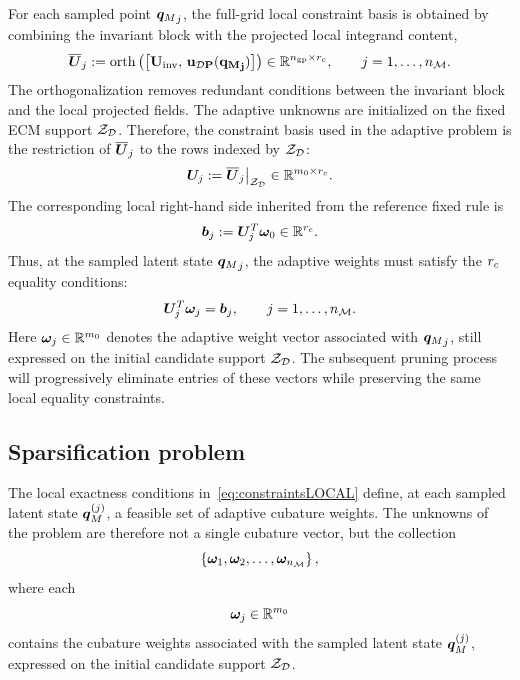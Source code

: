 \documentclass[11pt,a4paper]{article}
\newcommand{\PROMPT}[1]{ }
\begin{document}
For each sampled point \({\bm{q}_M}_j\), the full-grid local constraint basis is
obtained by combining the invariant block with the projected local integrand
content,
\begin{equation}
\label{eq:invariants}
    \overline{\bm{U}}_{j}
    :=
    \operatorname{orth}
    \left(
    \left[
    \bf{U}_{\mathrm{inv}},\,
    \bm{u}_{\mathcal{D}P}({\bm{q}_M}_j)
    \right]
    \right)
    \in
    \mathbb{R}^{n_{\mathrm{gp}}\times r_c},
    \qquad
    j=1,\ldots,n_{\mathcal{M}} .
\end{equation}
The orthogonalization removes redundant conditions between the invariant block
and the local projected fields.
The adaptive unknowns are initialized on the fixed ECM support \(\mathcal{Z}_{\mathcal{D}}\).
Therefore, the constraint basis used in the adaptive problem is the restriction
of \(\overline{\bm{U}}_{j}\) to the rows indexed by \(\mathcal{Z}_{\mathcal{D}}\):
\[
    \bm{U}_{j}
    :=
    \overline{\bm{U}}_{j}\big|_{\mathcal{Z}_{\mathcal{D}}}
    \in
    \mathbb{R}^{m_0\times r_c}.
\]
The corresponding local right-hand side inherited from the reference fixed rule
is
\[
    \bm{b}_{j}
    :=
    \bm{U}_{j}^{T}\bm{\omega}_0
    \in
    \mathbb{R}^{r_c}.
\]
Thus, at the sampled latent state \({\bm{q}_M}_j\), the adaptive weights must
satisfy the $r_c$   equality conditions:
\begin{equation}
\label{eq:constraintsLOCAL}
    \bm{U}_{j}^{T}\bm{\omega}_{j}
    =
    \bm{b}_{j},
    \qquad
    j=1,\ldots,n_{\mathcal{M}} .
\end{equation}
Here \(\bm{\omega}_{j}\in\mathbb{R}^{m_0}\) denotes the adaptive weight vector
associated with \({\bm{q}_M}_j\), still expressed on the initial candidate support
\(\mathcal{Z}_{\mathcal{D}}\). The subsequent pruning process will progressively eliminate entries of
these vectors while preserving the same local equality constraints.


\PROMPT{}

 \PROMPT{}

\subsection{Sparsification problem}
\label{sec:sparsification_problem}
 \PROMPT{}
The local exactness conditions in~\eqref{eq:constraintsLOCAL} define, at each
sampled latent state \(\bm{q}_M^{(j)}\), a feasible set of adaptive cubature
weights. The unknowns of the problem are therefore not a single cubature vector,
but the collection
\[
\left\{
\bm{\omega}_{1},
\bm{\omega}_{2},
\ldots,
\bm{\omega}_{n_{\mathcal{M}}}
\right\},
\]
where each
\[
\bm{\omega}_{j}\in\mathbb{R}^{m_0}
\]
contains the cubature weights associated with the sampled latent state
\(\bm{q}_M^{(j)}\), expressed on the initial candidate support \(\mathcal{Z}_{\mathcal{D}}\).
\end{document}
